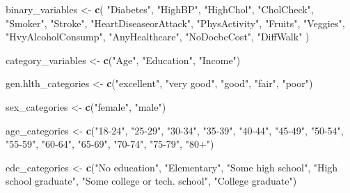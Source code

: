\documentclass[
]{article}
\newenvironment{Shaded}{\begin{snugshade}}{\end{snugshade}}
\newcommand{\FunctionTok}[1]{\textcolor[rgb]{0.13,0.29,0.53}{\textbf{#1}}}
\newcommand{\NormalTok}[1]{#1}
\newcommand{\OtherTok}[1]{\textcolor[rgb]{0.56,0.35,0.01}{#1}}
\newcommand{\StringTok}[1]{\textcolor[rgb]{0.31,0.60,0.02}{#1}}
\begin{document}
\begin{Shaded}
\begin{Highlighting}[]
\NormalTok{binary\_variables }\OtherTok{\textless{}{-}} \FunctionTok{c}\NormalTok{(}
  \StringTok{"Diabetes"}\NormalTok{,}
  \StringTok{"HighBP"}\NormalTok{, }
  \StringTok{"HighChol"}\NormalTok{, }
  \StringTok{"CholCheck"}\NormalTok{, }
  \StringTok{"Smoker"}\NormalTok{, }
  \StringTok{"Stroke"}\NormalTok{, }
  \StringTok{"HeartDiseaseorAttack"}\NormalTok{, }
  \StringTok{"PhysActivity"}\NormalTok{, }
  \StringTok{"Fruits"}\NormalTok{, }
  \StringTok{"Veggies"}\NormalTok{,}
  \StringTok{"HvyAlcoholConsump"}\NormalTok{,}
  \StringTok{"AnyHealthcare"}\NormalTok{,}
  \StringTok{"NoDocbcCost"}\NormalTok{,}
  \StringTok{"DiffWalk"}
\NormalTok{)}

\NormalTok{category\_variables }\OtherTok{\textless{}{-}} \FunctionTok{c}\NormalTok{(}\StringTok{"Age"}\NormalTok{, }\StringTok{"Education"}\NormalTok{, }\StringTok{"Income"}\NormalTok{)}

\NormalTok{gen.hlth\_categories }\OtherTok{\textless{}{-}} \FunctionTok{c}\NormalTok{(}\StringTok{"excellent"}\NormalTok{, }\StringTok{"very good"}\NormalTok{,}
                         \StringTok{"good"}\NormalTok{, }\StringTok{"fair"}\NormalTok{, }\StringTok{"poor"}\NormalTok{)}

\NormalTok{sex\_categories }\OtherTok{\textless{}{-}} \FunctionTok{c}\NormalTok{(}\StringTok{"female"}\NormalTok{, }\StringTok{"male"}\NormalTok{)}

\NormalTok{age\_categories }\OtherTok{\textless{}{-}} \FunctionTok{c}\NormalTok{(}\StringTok{"18{-}24"}\NormalTok{, }\StringTok{"25{-}29"}\NormalTok{, }\StringTok{"30{-}34"}\NormalTok{, }\StringTok{"35{-}39"}\NormalTok{,}
                    \StringTok{"40{-}44"}\NormalTok{, }\StringTok{"45{-}49"}\NormalTok{, }\StringTok{"50{-}54"}\NormalTok{, }\StringTok{"55{-}59"}\NormalTok{,}
                    \StringTok{"60{-}64"}\NormalTok{, }\StringTok{"65{-}69"}\NormalTok{, }\StringTok{"70{-}74"}\NormalTok{, }\StringTok{"75{-}79"}\NormalTok{,}
                    \StringTok{"80+"}\NormalTok{)}

\NormalTok{edc\_categories }\OtherTok{\textless{}{-}} \FunctionTok{c}\NormalTok{(}\StringTok{"No education"}\NormalTok{, }
                    \StringTok{"Elementary"}\NormalTok{, }
                    \StringTok{"Some high school"}\NormalTok{, }
                    \StringTok{"High school graduate"}\NormalTok{, }
                    \StringTok{"Some college or tech. school"}\NormalTok{, }
                    \StringTok{"College graduate"}\NormalTok{)}


\end{Highlighting}
\end{Shaded}
\end{document}
